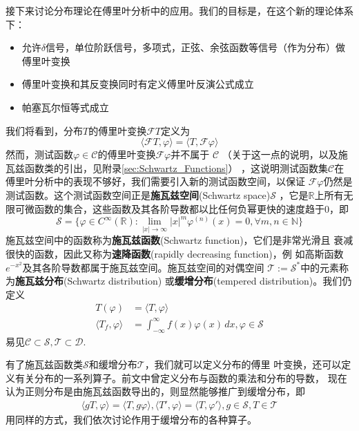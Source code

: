 \documentclass{ctexbook}
\begin{document}
接下来讨论分布理论在傅里叶分析中的应用。我们的目标是，在这个新的理论体系下：
\begin{itemize}
    \item 允许$\delta$信号，单位阶跃信号，多项式，正弦、余弦函数等信号（作为分布）做傅里叶变换
    \item 傅里叶变换和其反变换同时有定义傅里叶反演公式成立
    \item 帕塞瓦尔恒等式成立
\end{itemize}
我们将看到，分布$T$的傅里叶变换$\mathcal{F} T$定义为
\begin{equation}
    \langle\mathcal{F}T,\varphi\rangle=\langle T,\mathcal{F}\varphi\rangle
\end{equation}
然而，测试函数$\varphi\in\mathcal{C} $的傅里叶变换$\mathcal{F}\varphi$并不属于
$\mathcal{C} $
（关于这一点的说明，以及施瓦兹函数类的引出，见附录\ref{sec:Schwartz_Functions}）
，这说明测试函数集$\mathcal{C} $在傅里叶分析中的表现不够好，我们需要引入新的测试函数空间，以保证
$\mathcal{F}\varphi$仍然是测试函数。这个测试函数空间正是\textbf{施瓦兹空间}(Schwartz space)$\mathcal{S} $
，它是$\mathbb{R}$上所有无限可微函数的集合，这些函数及其各阶导数都以比任何负幂更快的速度趋于0，即
\[\mathcal{S} =\{\varphi\in C^{\infty}(\mathbb{R} ):\lim_{|x|\to\infty}|x|^m\varphi^{(n)}(x)=0,\forall m,n\in\mathbb{N} \}\]
施瓦兹空间中的函数称为\textbf{施瓦兹函数}(Schwartz function)，它们是非常光滑且
衰减很快的函数，因此又称为\textbf{速降函数}(rapidly decreasing function)，例
如高斯函数$e^{-x^2}$及其各阶导数都属于施瓦兹空间。施瓦兹空间的对偶空间
$\mathcal{T} :=\mathcal{S}^*$中的元素称为\textbf{施瓦兹分布}(Schwartz distribution)
或\textbf{缓增分布}(tempered distribution)。我们仍定义
\begin{align}
    T(\varphi)                 & =\langle T,\varphi\rangle                                        \\
    \langle T_f,\varphi\rangle & =\int_{-\infty}^{\infty}f(x)\varphi(x)\,dx,\varphi\in\mathcal{S}
\end{align}
易见$\mathcal{C} \subset \mathcal{S} ,\mathcal{T} \subset\mathcal{D}. $

有了施瓦兹函数类$\mathcal{S} $和缓增分布$\mathcal{T} $，我们就可以定义分布的傅里
叶变换，还可以定义有关分布的一系列算子。前文中曾定义分布与函数的乘法和分布的导数，
现在认为正则分布是由施瓦兹函数导出的，则显然能够推广到缓增分布，即\begin{align}
    \langle gT,\varphi\rangle=\langle T,g\varphi\rangle,\langle T',\varphi\rangle=\langle T,\varphi'\rangle,g\in\mathcal{S} ,T\in\mathcal{T}
\end{align}
用同样的方式，我们依次讨论作用于缓增分布的各种算子。
\end{document}
